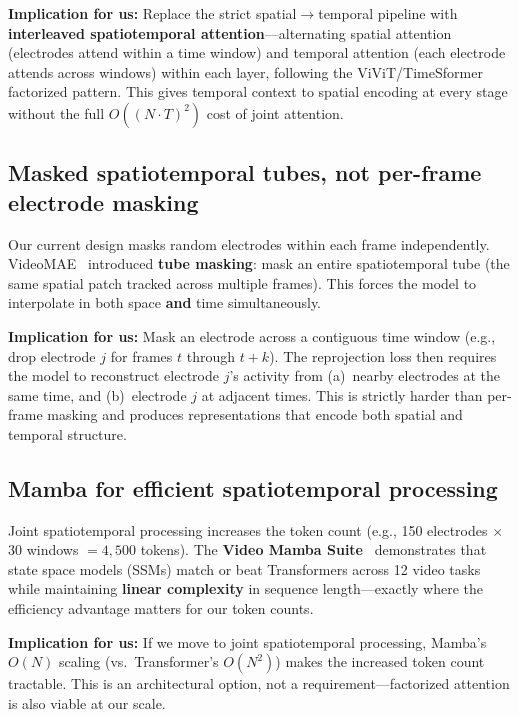 \documentclass[11pt,letterpaper]{article}
\begin{document}
\textbf{Implication for us:} Replace the strict spatial$\to$temporal pipeline with \textbf{interleaved spatiotemporal attention}---alternating spatial attention (electrodes attend within a time window) and temporal attention (each electrode attends across windows) within each layer, following the ViViT/TimeSformer factorized pattern. This gives temporal context to spatial encoding at every stage without the full $O((N{\cdot}T)^2)$ cost of joint attention.

\subsection{Masked spatiotemporal tubes, not per-frame electrode masking}

Our current design masks random electrodes within each frame independently. VideoMAE~\cite{videomae2022} introduced \textbf{tube masking}: mask an entire spatiotemporal tube (the same spatial patch tracked across multiple frames). This forces the model to interpolate in both space \textbf{and} time simultaneously.

\textbf{Implication for us:} Mask an electrode across a contiguous time window (e.g., drop electrode $j$ for frames $t$ through $t{+}k$). The reprojection loss then requires the model to reconstruct electrode $j$'s activity from (a)~nearby electrodes at the same time, and (b)~electrode $j$ at adjacent times. This is strictly harder than per-frame masking and produces representations that encode both spatial and temporal structure.

\subsection{Mamba for efficient spatiotemporal processing}

Joint spatiotemporal processing increases the token count (e.g., 150 electrodes $\times$ 30 windows $= 4{,}500$ tokens). The \textbf{Video Mamba Suite}~\cite{videomamba2025} demonstrates that state space models (SSMs) match or beat Transformers across 12 video tasks while maintaining \textbf{linear complexity} in sequence length---exactly where the efficiency advantage matters for our token counts.

\textbf{Implication for us:} If we move to joint spatiotemporal processing, Mamba's $O(N)$ scaling (vs.\ Transformer's $O(N^2)$) makes the increased token count tractable. This is an architectural option, not a requirement---factorized attention is also viable at our scale.
\end{document}

